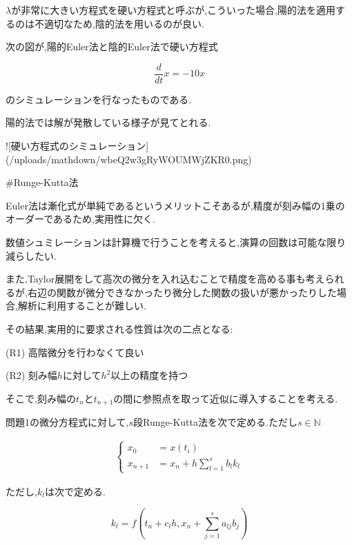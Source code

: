 $\lambda$が非常に大きい方程式を硬い方程式と呼ぶが,こういった場合,陽的法を適用するのは不適切なため,陰的法を用いるのが良い.



次の図が,陽的Euler法と陰的Euler法で硬い方程式

$$\dfrac{d}{dt}x=-10x$$

のシミュレーションを行なったものである.

陽的法では解が発散している様子が見てとれる.

![硬い方程式のシミュレーション](/uploads/mathdown/wbeQ2w3gRyWOUMWjZKR0.png)





#Runge-Kutta法

Euler法は漸化式が単純であるというメリットこそあるが,精度が刻み幅の1乗のオーダーであるため,実用性に欠く.

数値シュミレーションは計算機で行うことを考えると,演算の回数は可能な限り減らしたい.

また,Taylor展開をして高次の微分を入れ込むことで精度を高める事も考えられるが,右辺の関数が微分できなかったり微分した関数の扱いが悪かったりした場合,解析に利用することが難しい.

その結果,実用的に要求される性質は次の二点となる:



(R1) 高階微分を行わなくて良い

(R2) 刻み幅$h$に対して$h^2$以上の精度を持つ



そこで,刻み幅の$t_n$と$t_{n+1}$の間に参照点を取って近似に導入することを考える.



問題1の微分方程式に対して,$s$段Runge-Kutta法を次で定める.ただし$s\in\mathbb{N}$

\begin{align}

\begin{cases}

x_0&=x(t_i)\\

x_{n+1}&=x_n+h\displaystyle{\sum_{l=1}^sb_lk_l}

\end{cases}

\end{align}

ただし,$k_l$は次で定める.

$$k_l=f\left(t_n+c_lh,x_n+\sum_{j=1}^sa_{lj}b_j\right) $$

